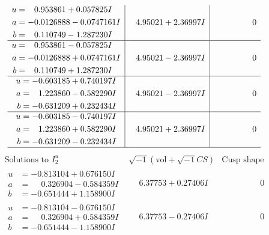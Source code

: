 \documentclass[1p]{elsarticle_modified}
\theoremstyle{definition}
\newcommand{\I}{\sqrt{-1}}
\begin{document}
$$\begin{array}{c|c|c}
\begin{aligned}
u &= \phantom{-}0.953861 + 0.057825 I \\
a &= -0.0126888 - 0.0747161 I \\
b &= \phantom{-}0.110749 - 1.287230 I\end{aligned}
 & \phantom{-}4.95021 + 2.36997 I & \phantom{-0.000000 } 0 \\ \hline\begin{aligned}
u &= \phantom{-}0.953861 - 0.057825 I \\
a &= -0.0126888 + 0.0747161 I \\
b &= \phantom{-}0.110749 + 1.287230 I\end{aligned}
 & \phantom{-}4.95021 - 2.36997 I & \phantom{-0.000000 } 0 \\ \hline\begin{aligned}
u &= -0.603185 + 0.740197 I \\
a &= \phantom{-}1.223860 - 0.582290 I \\
b &= -0.631209 + 0.232434 I\end{aligned}
 & \phantom{-}4.95021 - 2.36997 I & \phantom{-0.000000 } 0 \\ \hline\begin{aligned}
u &= -0.603185 - 0.740197 I \\
a &= \phantom{-}1.223860 + 0.582290 I \\
b &= -0.631209 - 0.232434 I\end{aligned}
 & \phantom{-}4.95021 + 2.36997 I & \phantom{-0.000000 } 0\\
 \hline 
 \end{array}$$\newpage$$\begin{array}{c|c|c}  
\text{Solutions to }I^u_{2}& \I (\text{vol} + \sqrt{-1}CS) & \text{Cusp shape}\\
 \hline 
\begin{aligned}
u &= -0.813104 + 0.676150 I \\
a &= \phantom{-}0.326904 - 0.584359 I \\
b &= -0.651444 + 1.158900 I\end{aligned}
 & \phantom{-}6.37753 + 0.27406 I & \phantom{-0.000000 } 0 \\ \hline\begin{aligned}
u &= -0.813104 - 0.676150 I \\
a &= \phantom{-}0.326904 + 0.584359 I \\
b &= -0.651444 - 1.158900 I\end{aligned}
 & \phantom{-}6.37753 - 0.27406 I & \phantom{-0.000000 } 0 \\ \hline\begin{aligned}

\end{aligned}
\end{array}$$
\end{document}

